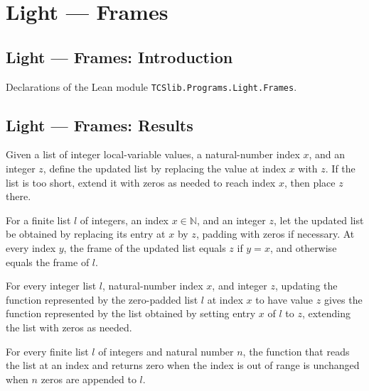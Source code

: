 \section{Light --- Frames}
\subsection*{Light --- Frames: Introduction}

Declarations of the Lean module \texttt{TCSlib.Programs.Light.Frames}.

\subsection*{Light --- Frames: Results}

\begin{definition}
\label{Light.setLocal}
\leanok
Given a list of integer local-variable values, a natural-number index $x$, and an
integer $z$, define the updated list by replacing the value at index $x$ with $z$. If
the list is too short, extend it with zeros as needed to reach index $x$, then place $z$
there.
\end{definition}

\begin{theorem}
\label{Light.frame_setLocal}
\leanok
{}
For a finite list $l$ of integers, an index $x\in\mathbb N$, and an integer $z$, let the
updated list be obtained by replacing its entry at $x$ by $z$, padding with zeros if
necessary. At every index $y$, the frame of the updated list equals $z$ if $y=x$, and
otherwise equals the frame of $l$.
\end{theorem}

\begin{theorem}
\label{Light.update_frame_setLocal}
\leanok
{}
For every integer list $l$, natural-number index $x$, and integer $z$, updating the
function represented by the zero-padded list $l$ at index $x$ to have value $z$ gives
the function represented by the list obtained by setting entry $x$ of $l$ to $z$,
extending the list with zeros as needed.
\end{theorem}

\begin{theorem}
\label{Light.frame_append_zeros}
\leanok
{}
For every finite list $l$ of integers and natural number $n$, the function that reads
the list at an index and returns zero when the index is out of range is unchanged when
$n$ zeros are appended to $l$.
\end{theorem}

